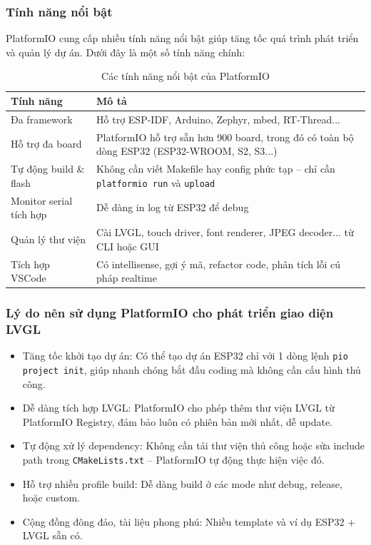 \subsubsection{Tính năng nổi bật}
\tab PlatformIO cung cấp nhiều tính năng nổi bật giúp tăng tốc quá trình phát triển và quản lý dự án. Dưới đây là một số tính năng chính:
\begin{table}[H]
\centering
\begin{tabularx}{\textwidth}{|>{\raggedright\arraybackslash}X|>{\raggedright\arraybackslash}X|}
\hline
\textbf{Tính năng} & \textbf{Mô tả} \\
\hline
Đa framework & Hỗ trợ ESP-IDF, Arduino, Zephyr, mbed, RT-Thread... \\
\hline
Hỗ trợ đa board & PlatformIO hỗ trợ sẵn hơn 900 board, trong đó có toàn bộ dòng ESP32 (ESP32-WROOM, S2, S3...) \\
\hline
Tự động build \& flash & Không cần viết Makefile hay config phức tạp – chỉ cần \texttt{platformio run} và \texttt{upload} \\
\hline
Monitor serial tích hợp & Dễ dàng in log từ ESP32 để debug \\
\hline
Quản lý thư viện & Cài LVGL, touch driver, font renderer, JPEG decoder... từ CLI hoặc GUI \\
\hline
Tích hợp VSCode & Có intellisense, gợi ý mã, refactor code, phân tích lỗi cú pháp realtime \\
\hline
\end{tabularx}
\caption{Các tính năng nổi bật của PlatformIO}
\end{table}


\subsubsection{Lý do nên sử dụng PlatformIO cho phát triển giao diện LVGL}
\begin{itemize}
    \item Tăng tốc khởi tạo dự án: Có thể tạo dự án ESP32 chỉ với 1 dòng lệnh \texttt{pio project init}, giúp nhanh chóng bắt đầu coding mà không cần cấu hình thủ công.
    \item Dễ dàng tích hợp LVGL: PlatformIO cho phép thêm thư viện LVGL từ PlatformIO Registry, đảm bảo luôn có phiên bản mới nhất, dễ update.
    \item Tự động xử lý dependency: Không cần tải thư viện thủ công hoặc sửa include path trong \texttt{CMakeLists.txt} – PlatformIO tự động thực hiện việc đó.
    \item Hỗ trợ nhiều profile build: Dễ dàng build ở các mode như debug, release, hoặc custom.
    \item Cộng đồng đông đảo, tài liệu phong phú: Nhiều template và ví dụ ESP32 + LVGL sẵn có.
\end{itemize}

